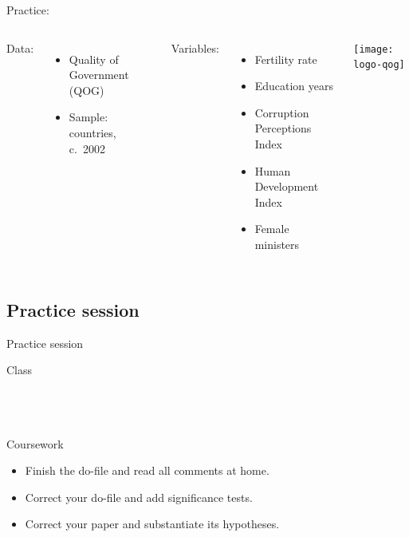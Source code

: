 \documentclass[t]{beamer}
\begin{document}
	\begin{frame}[t]{Practice: }

		\begin{columns}[c]

	    Data:\\[.5em]

			\begin{itemize}
				\item Quality of Government (QOG)
				\item Sample: countries, c.~2002
			\end{itemize}
		
			\vspace{.75em}
		
	    Variables:\\[.5em]
		
			\begin{itemize}
				\item Fertility rate
				\item Education years
				\item Corruption Perceptions Index
				\item Human Development Index
				\item Female ministers
			\end{itemize}
	

			\texttt{[image: logo-qog]}

		\end{columns}
	
	\end{frame}
	
	\subsection{Practice session}
  
	\begin{frame}[t]{Practice session}

    \begin{block}{Class}
      \\
      \\
      
			\\
			\\    
    \end{block}

    \begin{alertblock}{Coursework}
      \begin{itemize}
	      \item Finish the do-file and read all comments at home.
	      \item Correct your do-file and add significance tests.
	      \item Correct your paper and substantiate its hypotheses.
      \end{itemize}
    \end{alertblock}
    		
	\end{frame}
		
\end{document}
